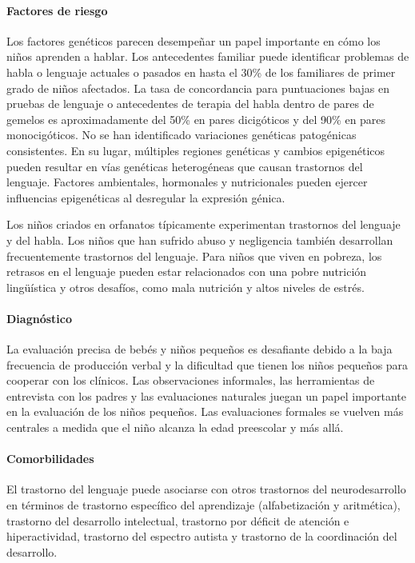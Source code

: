 \documentclass[11pt,letterpaper]{report}
\begin{document}
\paragraph{Factores de riesgo}
Los factores genéticos parecen desempeñar un papel importante en cómo los niños
aprenden a hablar. Los antecedentes familiar puede identificar problemas de
habla o lenguaje actuales o pasados en hasta el 30\% de los familiares de
primer grado de niños afectados. La tasa de concordancia para puntuaciones
bajas en pruebas de lenguaje o antecedentes de terapia del habla dentro de
pares de gemelos es aproximadamente del 50\% en pares dicigóticos y del 90\%
en pares monocigóticos. No se han identificado variaciones genéticas
patogénicas consistentes. En su lugar, múltiples regiones genéticas y cambios
epigenéticos pueden resultar en vías genéticas heterogéneas que causan
trastornos del lenguaje. Factores ambientales, hormonales y nutricionales
pueden ejercer influencias epigenéticas al desregular la expresión génica.
\cite{Nelson53}

Los niños criados en orfanatos típicamente experimentan trastornos del
lenguaje y del habla. Los niños que han sufrido abuso y negligencia también
desarrollan frecuentemente trastornos del lenguaje. Para niños que viven en
pobreza, los retrasos en el lenguaje pueden estar relacionados con una pobre
nutrición lingüística y otros desafíos, como mala nutrición y altos niveles
de estrés. \cite{Feldman44}

\paragraph{Diagnóstico}
La evaluación precisa de bebés y niños pequeños es desafiante debido a la
baja frecuencia de producción verbal y la dificultad que tienen los niños
pequeños para cooperar con los clínicos. Las observaciones informales, las
herramientas de entrevista con los padres y las evaluaciones naturales juegan
un papel importante en la evaluación de los niños pequeños. Las evaluaciones
formales se vuelven más centrales a medida que el niño alcanza la edad
preescolar y más allá. \cite{Nelson53}

\paragraph{Comorbilidades}
El trastorno del lenguaje puede asociarse con otros trastornos del
neurodesarrollo en términos de trastorno específico del aprendizaje
(alfabetización y aritmética), trastorno del desarrollo intelectual, trastorno
por déficit de atención e hiperactividad, trastorno del espectro autista y
trastorno de la coordinación del desarrollo. \cite{Feldman44}
\end{document}
